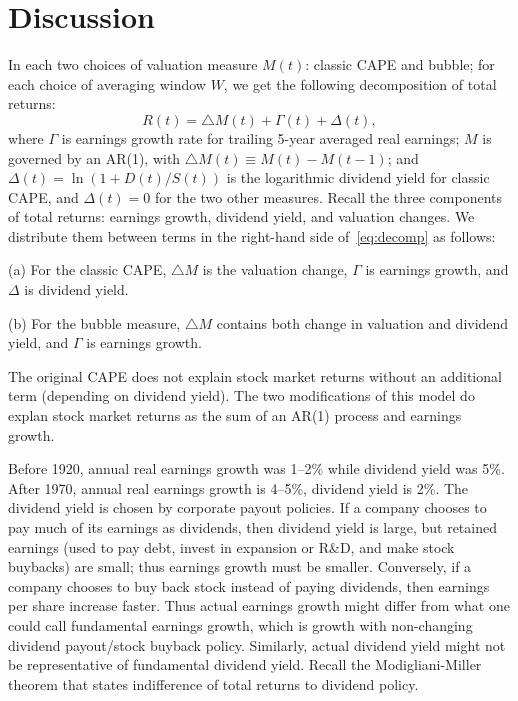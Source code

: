 \documentclass[12pt]{amsart}
\theoremstyle{definition}
\begin{document}


\section{Discussion} 

In each two choices of valuation measure $M(t)$: classic CAPE and bubble; for each choice of averaging window $W$, we get the following decomposition of total returns:
\begin{equation}
\label{eq:decomp}
R(t) = \triangle M(t) + \Gamma(t) + \Delta(t),
\end{equation}
where $\Gamma$ is earnings growth rate for trailing 5-year averaged real earnings; $M$ is governed by an AR(1), with $\triangle M(t) \equiv M(t) - M(t-1)$; and $\Delta(t) = \ln(1 + D(t)/S(t))$ is the logarithmic dividend yield for classic CAPE, and $\Delta(t) = 0$ for the two other measures. Recall the three components of total returns: earnings growth, dividend yield, and valuation changes. We distribute them between terms in the right-hand side of~\eqref{eq:decomp} as follows:

(a) For the classic CAPE, $\triangle M$ is the valuation change, $\Gamma$ is earnings growth, and $\Delta$ is dividend yield.

(b) For the bubble measure, $\triangle M$ contains both change in valuation and dividend yield, and $\Gamma$ is earnings growth.


The original CAPE does not explain stock market returns without an additional term (depending on dividend yield). The two modifications of this model do explan stock market returns as the sum of an AR(1) process and earnings growth. 

Before 1920, annual real earnings growth was 1--2\% while dividend yield was 5\%. After 1970, annual real earnings growth is 4--5\%, dividend yield is 2\%. The dividend yield is chosen by corporate payout policies. If a company chooses to pay much of its earnings as dividends, then dividend yield is large, but retained earnings (used to pay debt, invest in expansion or R\&D, and make stock buybacks) are small; thus earnings growth must be smaller. Conversely, if a company chooses to buy back stock instead of paying dividends, then earnings per share increase faster. Thus actual earnings growth might differ from what one could call fundamental earnings growth, which is growth with non-changing dividend payout/stock buyback policy. Similarly, actual dividend yield might not be representative of fundamental dividend yield. Recall the Modigliani-Miller theorem that states indifference of total returns to dividend policy. 
\end{document}
